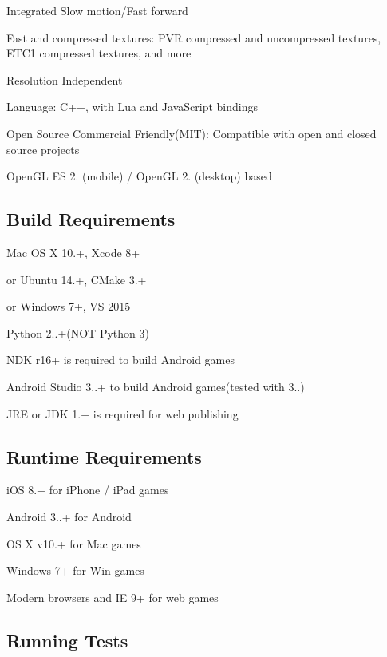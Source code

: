 \begin{DoxyItemize}
\item Integrated Slow motion/\+Fast forward
\item Fast and compressed textures\+: P\+VR compressed and uncompressed textures, E\+T\+C1 compressed textures, and more
\item Resolution Independent
\item Language\+: C++, with Lua and Java\+Script bindings
\item Open Source Commercial Friendly(\+M\+I\+T)\+: Compatible with open and closed source projects
\item Open\+GL ES 2. (mobile) / Open\+GL 2. (desktop) based
\end{DoxyItemize}

\subsection*{Build Requirements }


\begin{DoxyItemize}
\item Mac OS X 10.+, Xcode 8+
\item or Ubuntu 14.+, C\+Make 3.+
\item or Windows 7+, VS 2015
\item Python 2..+(N\+OT Python 3)
\item N\+DK r16+ is required to build Android games
\item Android Studio 3..+ to build Android games(tested with 3..)
\item J\+RE or J\+DK 1.+ is required for web publishing
\end{DoxyItemize}

\subsection*{Runtime Requirements }


\begin{DoxyItemize}
\item i\+OS 8.+ for i\+Phone / i\+Pad games
\item Android 3..+ for Android
\item OS X v10.+ for Mac games
\item Windows 7+ for Win games
\item Modern browsers and IE 9+ for web games
\end{DoxyItemize}

\subsection*{Running Tests }

